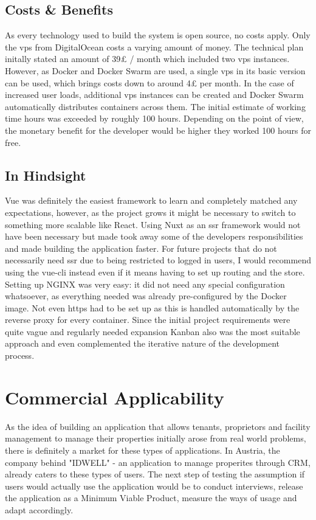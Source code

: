 \subsection{Costs \& Benefits}
As every technology used to build the system is open source, no costs apply. Only the \acrshort{vps} from DigitalOcean costs a varying amount of money. The technical plan initally stated an amount of 39£ / month which included two \acrshort{vps} instances. However, as Docker and Docker Swarm are used, a single \acrshort{vps} in its basic version can be used, which brings costs down to around 4£ per month. In the case of increased user loads, additional \acrshort{vps} instances can be created and Docker Swarm automatically distributes containers across them. The initial estimate of working time hours was exceeded by roughly 100 hours. Depending on the point of view, the monetary benefit for the developer would be higher they worked 100 hours for free.

\subsection{In Hindsight}
Vue was definitely the easiest framework to learn and completely matched any expectations, however, as the project grows it might be necessary to switch to something more scalable like React. Using Nuxt as an \acrshort{ssr} framework would not have been necessary but made took away some of the developers responsibilities and made building the application faster. For future projects that do not necessarily need \acrshort{ssr} due to being restricted to logged in users, I would recommend using the vue-cli instead even if it means having to set up routing and the store. Setting up NGINX was very easy: it did not need any special configuration whatsoever, as everything needed was already pre-configured by the Docker image. Not even https had to be set up as this is handled automatically by the reverse proxy for every container. Since the initial project requirements were quite vague and regularly needed expansion Kanban also was the most suitable approach and even complemented the iterative nature of the development process.

\section{Commercial Applicability}
As the idea of building an application that allows tenants, proprietors and facility management to manage their properties initially arose from real world problems, there is definitely a market for these types of applications. In Austria, the company behind "IDWELL" - an application to manage properites through CRM, already caters to these types of users. The next step of testing the assumption if users would actually use the application would be to conduct interviews, release the application as a Minimum Viable Product, measure the ways of usage and adapt accordingly.

